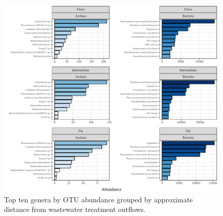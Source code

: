 \documentclass[letterpaper,12pt]{article}\usepackage[]{graphicx}\usepackage[]{color}
\newenvironment{knitrout}{}{} %
\begin{document}
\begin{knitrout}
\color{fgcolor}\begin{figure}[!ht]

{\centering \includegraphics[width=\textwidth]{figs/abundcont} 

}

\caption[Top ten genera by OTU abundance grouped by approximate distance from wastewater treatment outflows]{Top ten genera by OTU abundance grouped by approximate distance from wastewater treatment outflows.}\label{fig:abundcont}
\end{figure}


\end{knitrout}
\clearpage
\end{document}
